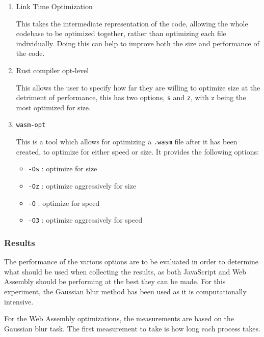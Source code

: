 \documentclass[12pt,a4paper]{article}
\begin{document}
\begin{enumerate}
    \item Link Time Optimization

          This takes the intermediate representation of the code, allowing the whole codebase to be optimized together, rather than optimizing each file individually. Doing this can help to improve both the size and performance of the code.

    \item Rust compiler opt-level

          This allows the user to specify how far they are willing to optimize size at the detriment of performance, this has two options, \texttt{s} and \texttt{z}, with z being the most optimized for size.

    \item \texttt{wasm-opt}

          This is a tool which allows for optimizing a \texttt{.wasm} file after it has been created, to optimize for either speed or size. It provides the following options:

          \begin{itemize}
              \item \texttt{-Os} : optimize for size
              \item \texttt{-Oz} : optimize aggressively for size
              \item \texttt{-O} : optimize for speed
              \item \texttt{-O3} : optimize aggressively for speed
          \end{itemize}

\end{enumerate}


\subsubsection{Results}

The performance of the various options are to be evaluated in order to determine what should be used when collecting the results, as both JavaScript and Web Assembly should be performing at the best they can be made. For this experiment, the Gaussian blur method has been used as it is computationally intensive.

For the Web Assembly optimizations, the measurements are based on the Gaussian blur task. The first measurement to take is how long each process takes.
\end{document}

